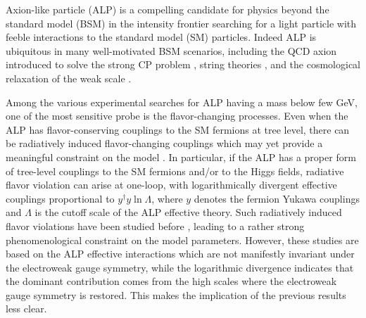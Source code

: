 \documentclass[preprint,prd,aps,tighten,nofootinbib,amssymb]{revtex4}
\begin{document}
Axion-like particle (ALP) is a compelling candidate for physics beyond the standard model (BSM) in the intensity frontier searching for a light particle with feeble interactions to the standard model (SM) particles.
Indeed ALP is ubiquitous in many well-motivated BSM scenarios, including the QCD axion introduced to solve the strong CP problem \cite{Peccei:1977hh,Kim:2008hd}, string theories \cite{Choi:1985je,Svrcek:2006yi, Arvanitaki:2009fg},  and the cosmological relaxation of the weak scale \cite{Graham:2015cka}.

Among the various experimental searches for ALP having a mass below few GeV, one of the most sensitive probe is the flavor-changing processes.
Even when the ALP has flavor-conserving couplings to the SM fermions at tree level, there can be  radiatively induced flavor-changing couplings which may yet provide a meaningful constraint on the model \cite{Batell:2009jf, Dolan:2014ska,Freytsis:2009ct}.
In particular, if the ALP has a proper form of tree-level couplings to the SM fermions and/or to the Higgs fields, radiative flavor violation can arise at one-loop, with logarithmically divergent effective couplings proportional to $y^\dagger y \ln \Lambda$, where $y$ denotes the fermion Yukawa couplings and $\Lambda$ is the cutoff scale of the ALP effective theory.   
Such radiatively induced flavor violations have been studied before \cite{Batell:2009jf, Dolan:2014ska}, leading to  a rather strong phenomenological constraint on the model parameters.  
However, these studies are based on the ALP effective interactions which are not manifestly invariant under the electroweak gauge symmetry, while the logarithmic divergence indicates that the dominant contribution comes from the high scales where the electroweak gauge symmetry is restored.
This makes the implication of the previous results \cite{Batell:2009jf, Dolan:2014ska} less clear.
\end{document}
